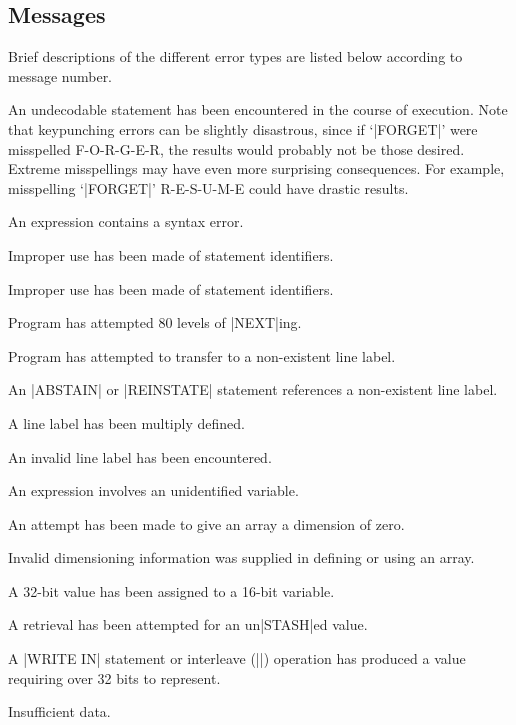 \subsection{Messages}

Brief descriptions of the different error types are listed below according
to message number.

\begin{description}
\def\ttitem#1{\item[{\tt #1}]}

\ttitem{000} An undecodable statement has been encountered in the course of
        execution.  Note that keypunching errors can be slightly disastrous,
        since if `|FORGET|' were misspelled F-O-R-G-E-R, the results would 
        probably not be those desired.  Extreme misspellings may have even 
        more surprising consequences.  For example, misspelling `|FORGET|' 
        R-E-S-U-M-E could have drastic results.

\ttitem{017} An expression contains a syntax error.

\ttitem{079} Improper use has been made of statement identifiers.

\ttitem{099} Improper use has been made of statement identifiers.

\ttitem{123} Program has attempted 80 levels of |NEXT|ing.

\ttitem{129} Program has attempted to transfer to a non-existent line label.

\ttitem{139} An |ABSTAIN| or |REINSTATE| statement references a non-existent line label.

\ttitem{182} A line label has been multiply defined.

\ttitem{197} An invalid line label has been encountered.

\ttitem{200} An expression involves an unidentified variable.

\ttitem{240} An attempt has been made to give an array a dimension of zero.

\ttitem{241} Invalid dimensioning information was supplied in defining or using
        an array.

\ttitem{275} A 32-bit value has been assigned to a 16-bit variable.

\ttitem{436} A retrieval has been attempted for an un|STASH|ed value.

\ttitem{533} A |WRITE IN| statement or interleave (|\change|) operation has
produced a value requiring over 32 bits to represent.

\ttitem{562} Insufficient data.


\end{description}
